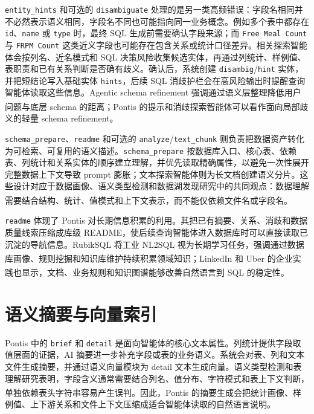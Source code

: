 \documentclass[
    bachelor,
    pdflinks,
]{xjtuthesis}
\newcommand{\upcite}[1]{\textsuperscript{\cite{#1}}}
\begin{document}
\texttt{entity\_hints} 和可选的 \texttt{disambiguate} 处理的是另一类高频错误：字段名相同并不必然表示语义相同，字段名不同也可能指向同一业务概念。例如多个表中都存在 \texttt{id}、\texttt{name} 或 \texttt{type} 时，最终 SQL 生成前需要确认字段来源；而 \texttt{Free Meal Count} 与 \texttt{FRPM Count} 这类近义字段也可能存在包含关系或统计口径差异。相关探索智能体会按列名、近名模式和 SQL 决策风险收集候选实体，再通过列统计、样例值、表职责和已有关系判断是否确有歧义。确认后，系统创建 \texttt{disambig}/\texttt{hint} 实体，并把短结论写入基础实体 \texttt{hints}，后续 SQL 消歧护栏会在高风险输出时提醒查询智能体读取这些信息。Agentic schema refinement 强调通过语义层整理降低用户问题与底层 schema 的距离\upcite{rissaki2024schemaRefinement}；Pontis 的提示和消歧探索智能体可以看作面向局部歧义的轻量 schema refinement。

\texttt{schema\_prepare}、\texttt{readme} 和可选的 \texttt{analyze}/\texttt{text\_chunk} 则负责把数据资产转化为可检索、可复用的语义描述。\texttt{schema\_prepare} 按数据库入口、核心表、依赖表、列统计和关系实体的顺序建立理解，并优先读取精确属性，以避免一次性展开完整数据上下文导致 prompt 膨胀；文本探索智能体则为长文档创建语义分片。这些设计对应于数据画像、语义类型检测和数据湖发现研究中的共同观点：数据理解需要结合结构、统计、值模式和上下文表示，而不能仅依赖文件名或字段名\upcite{abedjan2015profiling,hulsebos2019sherlock,fan2023starmie}。

\texttt{readme} 体现了 Pontis 对长期信息积累的利用。其把已有摘要、关系、消歧和数据质量线索压缩成库级 README，使后续查询智能体进入数据库时可以直接读取已沉淀的导航信息。RubikSQL 将工业 NL2SQL 视为长期学习任务，强调通过数据库画像、规则挖掘和知识库维护持续积累领域知识\upcite{chen2025rubiksql}；LinkedIn 和 Uber 的企业实践也显示，文档、业务规则和知识图谱能够改善自然语言到 SQL 的稳定性\upcite{chen2025enterpriseTextToSQL,johnson2024querygpt}。

\section{语义摘要与向量索引}

Pontis 中的 \texttt{brief} 和 \texttt{detail} 是面向智能体的核心文本属性。列统计提供字段取值层面的证据，AI 摘要进一步补充字段或表的业务语义。系统会对表、列和文本文件生成摘要，并通过语义向量模块为 detail 文本生成向量。语义类型检测和表理解研究表明，字段含义通常需要结合列名、值分布、字符模式和表上下文判断，单独依赖表头字符串容易产生误判\upcite{hulsebos2019sherlock}。因此，Pontis 的摘要生成会把统计画像、样例值、上下游关系和文件上下文压缩成适合智能体读取的自然语言说明。
\end{document}
